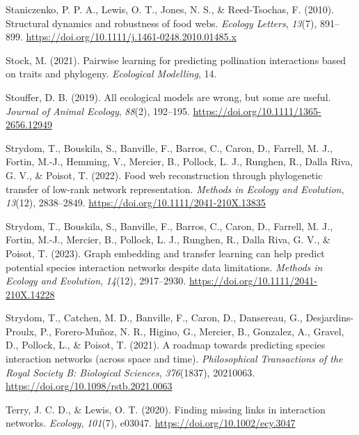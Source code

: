 \documentclass[
]{article}
\newlength{\cslhangindent}
\newenvironment{CSLReferences}[2] %
 {\begin{list}{}{%
  \setlength{\itemindent}{0pt}
  \setlength{\leftmargin}{0pt}
  \setlength{\parsep}{0pt}
  \ifodd #1
   \setlength{\leftmargin}{\cslhangindent}
   \setlength{\itemindent}{-1\cslhangindent}
  \fi
  \setlength{\itemsep}{#2\baselineskip}}}
 {\end{list}}
\begin{document}
\begin{CSLReferences}{1}{0}
Staniczenko, P. P. A., Lewis, O. T., Jones, N. S., \& Reed-Tsochas, F.
(2010). Structural dynamics and robustness of food webs. \emph{Ecology
Letters}, \emph{13}(7), 891--899.
\url{https://doi.org/10.1111/j.1461-0248.2010.01485.x}

Stock, M. (2021). Pairwise learning for predicting pollination
interactions based on traits and phylogeny. \emph{Ecological Modelling},
14.

Stouffer, D. B. (2019). All ecological models are wrong, but some are
useful. \emph{Journal of Animal Ecology}, \emph{88}(2), 192--195.
\url{https://doi.org/10.1111/1365-2656.12949}

Strydom, T., Bouskila, S., Banville, F., Barros, C., Caron, D., Farrell,
M. J., Fortin, M.-J., Hemming, V., Mercier, B., Pollock, L. J., Runghen,
R., Dalla Riva, G. V., \& Poisot, T. (2022). Food web reconstruction
through phylogenetic transfer of low-rank network representation.
\emph{Methods in Ecology and Evolution}, \emph{13}(12), 2838--2849.
\url{https://doi.org/10.1111/2041-210X.13835}

Strydom, T., Bouskila, S., Banville, F., Barros, C., Caron, D., Farrell,
M. J., Fortin, M.-J., Mercier, B., Pollock, L. J., Runghen, R., Dalla
Riva, G. V., \& Poisot, T. (2023). Graph embedding and transfer learning
can help predict potential species interaction networks despite data
limitations. \emph{Methods in Ecology and Evolution}, \emph{14}(12),
2917--2930. \url{https://doi.org/10.1111/2041-210X.14228}

Strydom, T., Catchen, M. D., Banville, F., Caron, D., Dansereau, G.,
Desjardins-Proulx, P., Forero-Muñoz, N. R., Higino, G., Mercier, B.,
Gonzalez, A., Gravel, D., Pollock, L., \& Poisot, T. (2021). A roadmap
towards predicting species interaction networks (across space and time).
\emph{Philosophical Transactions of the Royal Society B: Biological
Sciences}, \emph{376}(1837), 20210063.
\url{https://doi.org/10.1098/rstb.2021.0063}

Terry, J. C. D., \& Lewis, O. T. (2020). Finding missing links in
interaction networks. \emph{Ecology}, \emph{101}(7), e03047.
\url{https://doi.org/10.1002/ecy.3047}


\end{CSLReferences}
\end{document}
